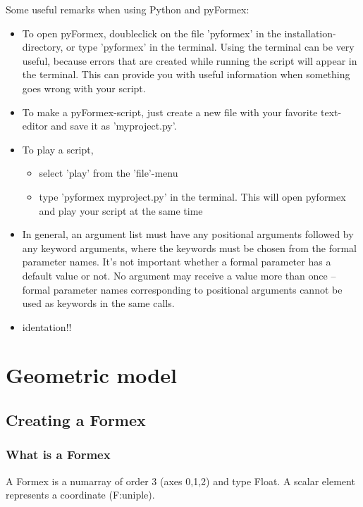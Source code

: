 \documentclass[a4paper]{manual}
\begin{document}
{Some useful remarks when using Python and pyFormex:
\begin{itemize}
\item To open pyFormex, doubleclick on the file 'pyformex' in the installation-directory, or type 'pyformex' in the terminal. Using the terminal can be very useful, because errors that are created while running the script will appear in the terminal. This can provide you with useful information when something goes wrong with your script.
\item To make a pyFormex-script, just create a new file with your favorite text-editor and save it as 'myproject.py'.
\item To play a script, 
	\begin{itemize}
	\item select 'play' from the 'file'-menu
	\item type 'pyformex myproject.py' in the terminal. This will open pyformex and play your script at the same time
	\end{itemize}
\item In general, an argument list must have any positional arguments followed by any keyword arguments, where the keywords must be chosen from the formal parameter names. It's not important whether a formal parameter has a default value or not. No argument may receive a value more than once -- formal parameter names corresponding to positional arguments cannot be used as keywords in the same calls. %
\item identation!!

\end{itemize}

\section{Geometric model}

  
\subsection{Creating a Formex}

\subsubsection{What is a Formex}

A Formex is a numarray of order 3 (axes 0,1,2) and type Float.
A scalar element represents a coordinate (F:uniple).

}
\end{document}
